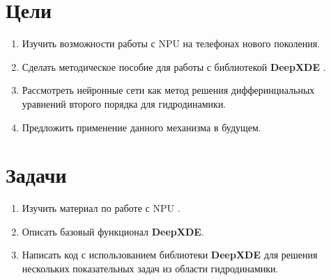 \chapter{Цели}
\begin{enumerate}
    \item Изучить возможности работы с NPU на телефонах нового поколения.
    \item Сделать методическое пособие для работы с библиотекой \textbf{DeepXDE} \cite{lu2021deepxde}.
    \item Рассмотреть нейронные сети как метод решения дифферинциальных уравнений второго порядка
    для гидродинамики.
    \item Предложить применение данного механизма в будущем.
\end{enumerate}

\chapter{Задачи}
\begin{enumerate}
    \item Изучить материал по работе с NPU \cite{nnapi}.
    \item Описать базовый функционал \textbf{DeepXDE}.
    \item Написать код с использованием библиотеки \textbf{DeepXDE} для решения нескольких 
    показательных задач из области гидродинамики.
\end{enumerate}

